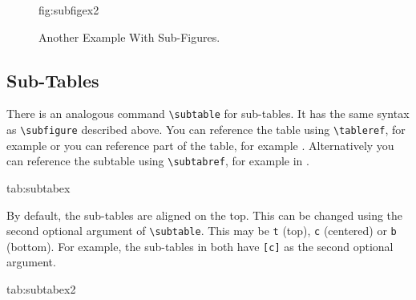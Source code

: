 \documentclass[pmlr,twocolumn,10pt]{jmlr} %
\begin{document}
\begin{figure}[htbp]
\floatconts
  {fig:subfigex2}
  {\caption{Another Example With Sub-Figures.}}
  {%
    \qquad
  }
\end{figure}

\subsection{Sub-Tables}
\label{sec:subtables}
There is an analogous command \verb|\subtable| for sub-tables.
It has the same syntax as \verb|\subfigure| described above.
You can reference the table using \verb|\tableref|, for example
 or you can reference part of the table,
for example . Alternatively you can reference the
subtable using \verb|\subtabref|, for example
 in .

\begin{table}[htbp]
\floatconts
 {tab:subtabex}
 {\caption{An Example With Sub-Tables}}
 {%
   \qquad
 }
\end{table}

By default, the sub-tables are aligned on the top.
This can be changed using the second optional argument
of \verb|\subtable|. This may be \texttt{t} (top), \texttt{c}
(centered) or \texttt{b} (bottom). For example, the sub-tables
 in 
both have \verb|[c]| as the second optional argument.

\begin{table}[htbp]
\floatconts
 {tab:subtabex2}
 {\caption{Another Example With Sub-Tables}}
 {%
   \qquad
 }
\end{table}
\end{document}

